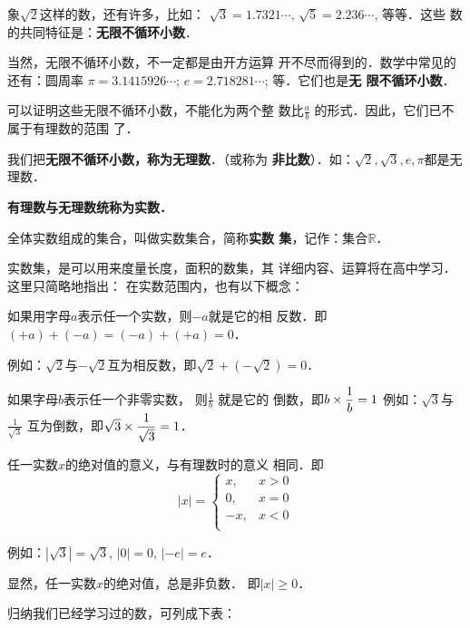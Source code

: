 象$\sqrt{2}$这样的数，还有许多，比如：
$\sqrt{3}=1.7321\cdots$, $\sqrt{5}=2.236\cdots$, 等等．这些
数的共同特征是：\textbf{无限不循环小数}．

当然，无限不循环小数，不一定都是由开方运算
开不尽而得到的．数学中常见的还有：圆周率
$\pi=3.1415926\cdots$; $e=2.718281\cdots$; 等．它们也是\textbf{无
限不循环小数}．

可以证明这些无限不循环小数，不能化为两个整
数比$\frac{a}{b}$
的形式．因此，它们已不属于有理数的范围
了．

我们把\textbf{无限不循环小数，称为无理数}．（或称为
\textbf{非比数}）．如：$\sqrt{2},\sqrt{3},e,\pi$都是无理数．

\textbf{有理数与无理数统称为实数．}

全体实数组成的集合，叫做实数集合，简称\textbf{实数
集}，记作：集合$\mathbb{R}$．

实数集，是可以用来度量长度，面积的数集，其
详细内容、运算将在高中学习．这里只简略地指出：
在实数范围内，也有以下概念：

如果用字母$a$表示任一个实数，则$-a$就是它的相
反数．即$(+a)+(-a)=(-a)+(+a)=0$．

例如：$\sqrt{2}$与$-\sqrt{2}$互为相反数，即$\sqrt{2}+\left(-\sqrt{2}\right)=0$．

如果字母$b$表示任一个非零实数，
则$\frac{1}{b}$
就是它的
倒数，即$b\times\dfrac{1}{b}=1$
例如：$\sqrt{3}$与$\frac{1}{\sqrt{3}}$
互为倒数，即$\sqrt{3}\times \dfrac{1}{\sqrt{3}}=1$．

任一实数$x$的绝对值的意义，与有理数时的意义
相同．即
\[|x|=\begin{cases}
    x, & x>0\\
    0, & x=0\\
    -x, & x<0\\  
\end{cases}\]

例如：$|\sqrt{3}|=\sqrt{3}$, $|0|=0$, $|-e|=e$．

显然，任一实数$x$的绝对值，总是非负数．
即$|x|\ge 0$．

归纳我们已经学习过的数，可列成下表：

\begin{center}
\end{center}



